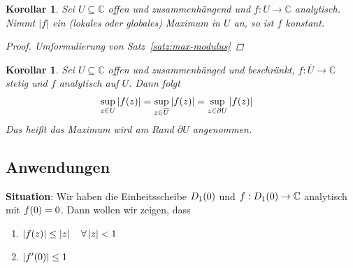\documentclass[11pt, a4paper]{article}
\theoremstyle{plain}
\newtheorem{korollar}[blockelement]{Korollar}
\numberwithin{equation}{subsection}
\newcommand{\of}[1]{\mathopen{}\mathclose{}\bgroup\left(#1\aftergroup\egroup\right)}
\newcommand{\abs}[1]{\left\lvert#1\right\rvert}
\newcommand{\C}{\mathbb{C}}
\begin{document}
    \begin{korollar} %
        Sei $U\subseteq\C$ offen und zusammenhängend und $f: U \to\C$ analytisch. Nimmt $\abs{f}$ ein (lokales oder globales) Maximum in $U$ an, so ist $f$ konstant.
        \begin{proof}
            Umformulierung von Satz~\ref{satz:max-modulus}
        \end{proof}
    \end{korollar}

    \begin{korollar}
        Sei $U\subseteq\C$ offen und zusammenhänged und beschränkt, $f: \overline{U}\to\C$ stetig und $f$ analytisch auf $U$. Dann folgt
        \begin{align*}
            \sup_{z\in U} \abs{f\of{z}} &= \sup_{z\in\overline{U}} \abs{f\of{z}} = \sup_{z\in \partial U} \abs{f\of{z}}
        \end{align*}
        Das heißt das Maximum wird am Rand $\partial U$ angenommen.
    \end{korollar}

    \subsection{Anwendungen}

    \textbf{Situation}: Wir haben die Einheitsscheibe $D_1\of{0}$ und $f: D_1\of{0} \to \C$ analytisch mit $f\of{0} = 0$. Dann wollen wir zeigen, dass
    \begin{enumerate}[label=(\alph*)]
        \item $\abs{f\of{z}} \leq \abs{z}\quad\forall \abs{z} < 1$
        \item $\abs{f'\of{0}} \leq 1$
    \end{enumerate}
\end{document}
